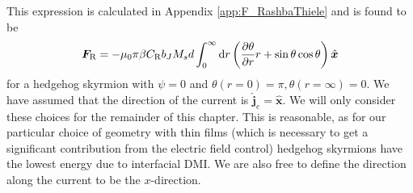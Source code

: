 This expression is calculated in Appendix \ref{app:F_RashbaThiele} and is found to be
\begin{align}
\mathbold{F}_{\text{R}} = -\mu_0 \pi\beta C_{\text{R}} b_J M_s d \int_0^{\infty} \d r \left(\frac{\partial \theta}{\partial r} r + \sin\theta\cos\theta \right) \mathbold{\hat{x}}
\end{align}
for a hedgehog skyrmion with $\psi = 0$ and $\theta(r=0)=\pi, \theta(r=\infty)=0$. We have assumed that the direction of the current is $\mathbold{\hat{j}}_e = \mathbold{\hat{x}}$. We will only consider these choices for the remainder of this chapter. This is reasonable, as for our particular choice of geometry with thin films (which is necessary to get a significant contribution from the electric field control) hedgehog skyrmions have the lowest energy due to interfacial DMI. We are also free to define the direction along the current to be the $x$-direction.


